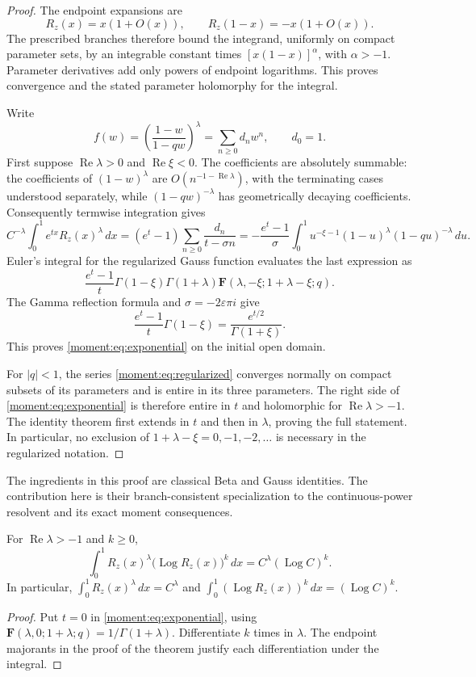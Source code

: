 \begin{proof}
The endpoint expansions are
\[
 R_z(x)=x(1+O(x)),\qquad
 R_z(1-x)=-x(1+O(x)).
\]
The prescribed branches therefore bound the integrand, uniformly on
compact parameter sets, by an integrable constant times
$[x(1-x)]^{\alpha}$, with $\alpha>-1$. Parameter derivatives add
only powers of endpoint logarithms. This proves convergence and the
stated parameter holomorphy for the integral.

Write
\[
 f(w)=\left(\frac{1-w}{1-qw}\right)^\lambda
      =\sum_{n\ge0}d_nw^n,
 \qquad d_0=1.
\]
First suppose $\operatorname{Re}\lambda>0$ and
$\operatorname{Re}\xi<0$. The coefficients are absolutely summable:
the coefficients of $(1-w)^\lambda$ are
$O(n^{-1-\operatorname{Re}\lambda})$, with the terminating cases
understood separately, while $(1-qw)^{-\lambda}$ has geometrically
decaying coefficients. Consequently termwise integration gives
\[
 C^{-\lambda}\int_0^1e^{tx}R_z(x)^\lambda\,dx
 =(e^t-1)\sum_{n\ge0}\frac{d_n}{t-\sigma n}
 =-\frac{e^t-1}{\sigma}\int_0^1
        u^{-\xi-1}(1-u)^\lambda(1-qu)^{-\lambda}\,du.
\]
Euler's integral for the regularized Gauss function
\cite[15.6.1]{DLMF} evaluates the last expression as
\[
 \frac{e^t-1}{t}
 \Gamma(1-\xi)\Gamma(1+\lambda)
 \mathbf F(\lambda,-\xi;1+\lambda-\xi;q).
\]
The Gamma reflection formula and $\sigma=-2\varepsilon\pi i$ give
\[
 \frac{e^t-1}{t}\Gamma(1-\xi)
       =\frac{e^{t/2}}{\Gamma(1+\xi)}.
\]
This proves \eqref{moment:eq:exponential} on the initial open domain.

For $|q|<1$, the series \eqref{moment:eq:regularized} converges
normally on compact subsets of its parameters and is entire in its
three parameters. The right side of \eqref{moment:eq:exponential}
is therefore entire in $t$ and holomorphic for
$\operatorname{Re}\lambda>-1$. The identity theorem first extends
in $t$ and then in $\lambda$, proving the full statement. In
particular, no exclusion of $1+\lambda-\xi=0,-1,-2,\ldots$ is
necessary in the regularized notation.
\end{proof}

The ingredients in this proof are classical Beta and Gauss identities.
The contribution here is their branch-consistent specialization to the
continuous-power resolvent and its exact moment consequences.

\begin{corollary}
\label{moment:cor:mean}
For $\operatorname{Re}\lambda>-1$ and $k\ge0$,
\begin{equation}\label{moment:eq:meanlogs}
 \int_0^1 R_z(x)^\lambda
       \bigl(\operatorname{Log}R_z(x)\bigr)^k\,dx
       =C^\lambda(\operatorname{Log}C)^k.
\end{equation}
In particular, $\int_0^1R_z(x)^\lambda\,dx=C^\lambda$ and
$\int_0^1(\operatorname{Log}R_z(x))^k\,dx=(\operatorname{Log}C)^k$.
\end{corollary}
\begin{proof}
Put $t=0$ in \eqref{moment:eq:exponential}, using
$\mathbf F(\lambda,0;1+\lambda;q)=1/\Gamma(1+\lambda)$.
Differentiate $k$ times in $\lambda$. The endpoint majorants in the
proof of the theorem justify each differentiation under the integral.
\end{proof}

